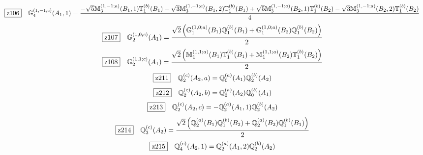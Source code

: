 \documentclass[fleqn,10pt,landscape]{jsarticle}
\begin{document}
\begin{dmath*}
\hspace*{3mm}\fbox{z106}\quad \mathbb{G}_{4}^{(1,-1;c)}(A_{1},1)=\frac{- \sqrt{5} \mathbb{M}_{3}^{(1,-1;a)}(B_{1},1) \mathbb{T}_{1}^{(b)}(B_{1}) - \sqrt{3} \mathbb{M}_{3}^{(1,-1;a)}(B_{1},2) \mathbb{T}_{1}^{(b)}(B_{1}) + \sqrt{5} \mathbb{M}_{3}^{(1,-1;a)}(B_{2},1) \mathbb{T}_{1}^{(b)}(B_{2}) - \sqrt{3} \mathbb{M}_{3}^{(1,-1;a)}(B_{2},2) \mathbb{T}_{1}^{(b)}(B_{2})}{4}
\end{dmath*}
\begin{dmath*}
\hspace*{3mm}\fbox{z107}\quad \mathbb{G}_{2}^{(1,0;c)}(A_{1})=\frac{\sqrt{2} \left(\mathbb{G}_{1}^{(1,0;a)}(B_{1}) \mathbb{Q}_{1}^{(b)}(B_{1}) + \mathbb{G}_{1}^{(1,0;a)}(B_{2}) \mathbb{Q}_{1}^{(b)}(B_{2})\right)}{2}
\end{dmath*}
\begin{dmath*}
\hspace*{3mm}\fbox{z108}\quad \mathbb{G}_{2}^{(1,1;c)}(A_{1})=\frac{\sqrt{2} \left(\mathbb{M}_{1}^{(1,1;a)}(B_{1}) \mathbb{T}_{1}^{(b)}(B_{1}) + \mathbb{M}_{1}^{(1,1;a)}(B_{2}) \mathbb{T}_{1}^{(b)}(B_{2})\right)}{2}
\end{dmath*}
\begin{dmath*}
\hspace*{3mm}\fbox{z211}\quad \mathbb{Q}_{2}^{(c)}(A_{2},a)=\mathbb{Q}_{0}^{(a)}(A_{1}) \mathbb{Q}_{2}^{(b)}(A_{2})
\end{dmath*}
\begin{dmath*}
\hspace*{3mm}\fbox{z212}\quad \mathbb{Q}_{2}^{(c)}(A_{2},b)=\mathbb{Q}_{2}^{(a)}(A_{2}) \mathbb{Q}_{0}^{(b)}(A_{1})
\end{dmath*}
\begin{dmath*}
\hspace*{3mm}\fbox{z213}\quad \mathbb{Q}_{2}^{(c)}(A_{2},c)=- \mathbb{Q}_{2}^{(a)}(A_{1},1) \mathbb{Q}_{2}^{(b)}(A_{2})
\end{dmath*}
\begin{dmath*}
\hspace*{3mm}\fbox{z214}\quad \mathbb{Q}_{3}^{(c)}(A_{2})=\frac{\sqrt{2} \left(\mathbb{Q}_{2}^{(a)}(B_{1}) \mathbb{Q}_{1}^{(b)}(B_{2}) + \mathbb{Q}_{2}^{(a)}(B_{2}) \mathbb{Q}_{1}^{(b)}(B_{1})\right)}{2}
\end{dmath*}
\begin{dmath*}
\hspace*{3mm}\fbox{z215}\quad \mathbb{Q}_{4}^{(c)}(A_{2},1)=\mathbb{Q}_{2}^{(a)}(A_{1},2) \mathbb{Q}_{2}^{(b)}(A_{2})
\end{dmath*}
\end{document}
